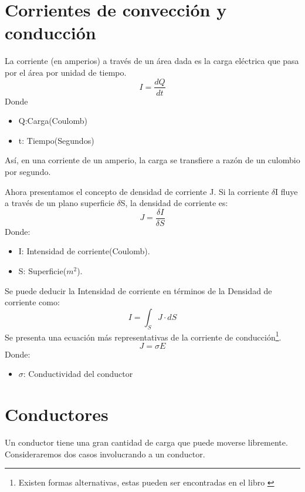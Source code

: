 \documentclass[
	12pt, %
	fleqn, %
	a4paper, %
	oneside, %
]{LegrandOrangeBook}
\begin{document}
\section{Corrientes de convección y conducción}
\begin{definition}[Corriente]
La corriente (en amperios) a través de un área dada es la carga eléctrica que pasa por el área por unidad de tiempo.\\
\begin{equation}
\label{eq:corriente}
I=\frac{dQ}{dt}
\end{equation}
Donde\\
\begin{itemize}
\item Q:Carga(Coulomb)
\item t: Tiempo(Segundos)
\end{itemize}
Así, en una corriente de un amperio, la carga se transfiere a razón de un culombio por segundo.
\end{definition}
\begin{definition}
Ahora presentamos el concepto de densidad de corriente J. Si la corriente $\delta$I fluye a través de un plano superficie $\delta$S, la densidad de corriente es:
\begin{equation}
\label{eq: densidad de corriente}
J=\frac{\delta I}{\delta S}
\end{equation}
Donde:
\begin{itemize}
\item I: Intensidad de corriente(Coulomb).
\item S: Superficie($m^2$).
\end{itemize}
\end{definition}
Se puede deducir la Intensidad de corriente en términos de la Densidad de corriente como:
\begin{equation}
\label{eq:intensidad y densidad de corriente}
I=\int_SJ\cdot dS
\end{equation}
Se presenta una ecuación más representativas de la corriente de conducción\footnote{Existen formas alternativas, estas pueden ser encontradas en el libro \cite{sadiku2018elements}}.
\begin{equation}\label{eq:JsigmaE}
J=\sigma E
\end{equation}
Donde:
\begin{itemize}
\item $\sigma$: Conductividad del conductor
\end{itemize}
\section{Conductores}
Un conductor tiene una gran cantidad de carga que puede moverse libremente. Consideraremos dos casos involucrando a un conductor.
\end{document}
